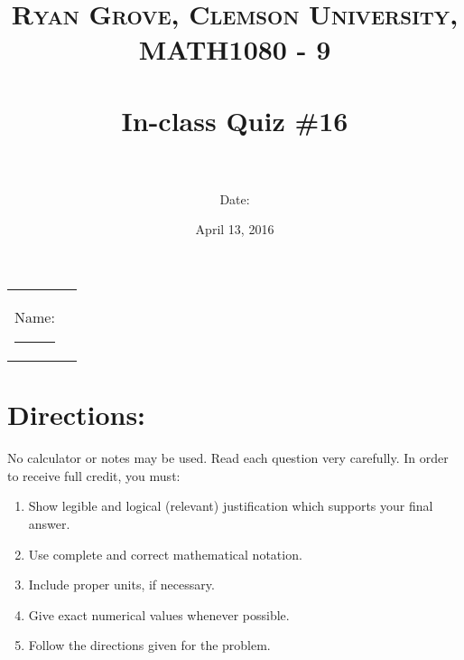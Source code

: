 \documentclass[paper=a4, fontsize=11pt]{scrartcl} %
\title{	
\normalfont \normalsize 
\textsc{Ryan Grove, Clemson University, MATH1080 - 9} \\ [25pt] %
\horrule{0.5pt} \\[0.4cm] %
\huge In-class Quiz \#16 \\ %
\horrule{2pt} \\[0.5cm] %
}
\author{Date:} %
\date{\normalsize April 13, 2016} %
\numberwithin{equation}{section} %
\numberwithin{figure}{section} %
\numberwithin{table}{section} %
\begin{document}
\maketitle %

\begin{flushleft}
\begin{tabular}{l l}
Name: \rule{3.2in}{.01cm}  & {}%
\end{tabular}
\end{flushleft}


\section*{\textbf{Directions:}}

No calculator or notes may be used.  Read each question very carefully.  In order to receive full credit, you must:
\begin{enumerate}
\item Show legible and logical (relevant) justification which supports your final answer.
\item Use complete and correct mathematical notation.
\item Include proper units, if necessary.
\item Give exact numerical values whenever possible.
\item Follow the directions given for the problem.
\end{enumerate}
\vspace{.1in}

\newpage
\end{document}
